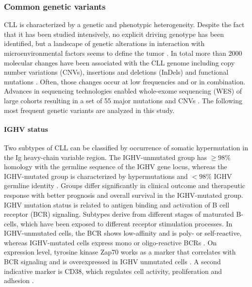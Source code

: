 \subsubsection{Common genetic variants}
CLL is characterized by a genetic and phenotypic heterogeneity. Despite the fact that it has been studied intensively, no explicit driving genotype has been identified, but a landscape of genetic alterations in interaction with microenvironmental factors seems to define the tumor \citep{Rossi2016}. In total more than 2000 molecular changes have been associated with the CLL genome including copy number variations (CNVs), insertions and deletions (InDels) and functional mutations \citep{Puente2015}. Often, those changes occur at low frequencies and or in combination. Advances in sequencing technologies enabled whole-exome sequencing (WES) of large cohorts resulting in a set of 55 major mutations and CNVs \citep{Landau2015}. The following most frequent genetic variants are analyzed in this study.

\paragraph{IGHV status}
Two subtypes of CLL can be classified by occurrence of somatic hypermutation in the Ig heavy-chain variable region. The IGHV-unmutated group has $\geq 98\%$ homology with the germline sequence of the IGHV gene locus, whereas the IGHV-mutated group is characterized by hypermutations and $< 98\%$ IGHV germline identity \citep{Burns2017}. Groups differ significantly in clinical outcome and therapeutic response with better prognosis and overall survival in the IGHV-mutated group. IGHV mutation status is related to antigen binding and activation of B cell receptor (BCR) signaling. Subtypes derive from different stages of maturated B-cells, which have been exposed to different receptor stimulation processes. In IGHV-unmutated cells, the BCR shows low-affinity and is poly- or self-reactive, whereas IGHV-mutated cells express mono or oligo-reactive BCRs \citep{Fabbri2016}. On expression level, tyrosine kinase Zap70 works as a marker that correlates with BCR signaling and is overexpressed in IGHV unmutated cells \citep{Stevenson2011}. A second indicative marker is CD38, which regulates cell activity, proliferation and adhesion \citep{Cruse2007}.   


